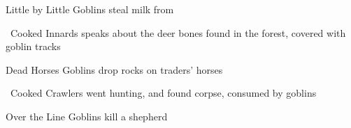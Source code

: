
{Little by Little}%
{Goblins steal milk from }%

{\squash~Cooked Innards}%
{ speaks about the deer bones found in the forest, covered with goblin tracks}%

{Dead Horses}%
{Goblins drop rocks on traders' horses}%

{\squash~Cooked Crawlers}%
{ went hunting, and found  corpse, consumed by goblins}%

{Over the Line}%
{Goblins kill a shepherd}%


